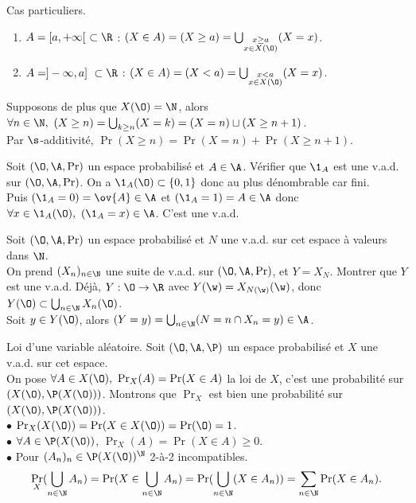 \documentclass[11pt]{article}
\begin{document}
\begin{ex}{Cas particuliers.}{}
    \begin{enumerate}
        \item $A=[a,+\infty[~\subset\R$ : $(X\in A) = (X\geq a) = \bigcup_{\substack{x\geq a\\x\in X(\O)}}(X=x)$.
        \item $A=]-\infty,a]~\subset\R$ : $(X \in A) = (X < a) = \bigcup_{\substack{x < a \\ x \in X(\O)}}(X=x)$. 
    \end{enumerate}
    Supposons de plus que $X(\O) = \N$, alors $\forall n \in \N, ~ (X\geq n) = \bigcup_{k\geq n}(X=k)=(X=n)\sqcup(X\geq n+1)$.\\
    Par $\s$-additivité, $\Pr(X\geq n) = \Pr(X=n)+\Pr(X\geq n+1)$.
\end{ex}

\pagebreak

\begin{ex}{}{}
    Soit $(\O,\A,\Pr)$ un espace probabilisé et $A\in\A$. Vérifier que $\1_A$ est une v.a.d. sur $(\O,\A,\Pr)$.
    \tcblower
    On a $\1_A(\O)\subset\{0,1\}$ donc au plus dénombrable car fini.\\
    Puis $(\1_A = 0) = \ov{A} \in \A$ et $(\1_A = 1) = A \in \A$ donc $\forall x \in \1_A(\O), ~ (\1_A = x) \in \A$. C'est une v.a.d. 
\end{ex}

\begin{exercice}{}{}
    Soit $(\O,\A,\Pr)$ un espace probabilisé et $N$ une v.a.d. sur cet espace à valeurs dans $\N$.\\
    On prend $(X_n)_{n\in\N}$ une suite de v.a.d. sur $(\O,\A,\Pr)$, et $Y=X_N$. Montrer que $Y$ est une v.a.d.
    \tcblower
    Déjà, $Y:\O\to\R$ avec $Y(\w)=X_{N(\w)}(\w)$, donc $Y(\O)\subset\bigcup_{n\in\N}X_n(\O)$.\\
    Soit $y\in Y(\O)$, alors $(Y = y) = \bigcup_{n\in\N}(N = n \cap X_n = y)\in\A$.
\end{exercice}

\begin{defi}{Loi d'une variable aléatoire.}{}
    Soit $(\O,\A,\P)$ un espace probabilisé et $X$ une v.a.d. sur cet espace.\\
    On pose $\forall A \in X(\O), ~ \Pr_X(A)=\Pr(X\in A)$ la loi de $X$, c'est une probabilité sur $(X(\O), \P(X(\O)))$.
    \tcblower
    Montrons que $\Pr_X$ est bien une probabilité sur $(X(\O), \P(X(\O)))$.\\
    $\bullet$ $\Pr_X(X(\O))=\Pr(X\in X(\O))=\Pr(\O)=1$.\\
    $\bullet$ $\forall A \in \P(X(\O))$, $\Pr_X(A)=\Pr(X\in A)\geq 0$.\\
    $\bullet$ Pour $(A_n)_n\in\P(X(\O))^\N$ 2-à-2 incompatibles.
    \begin{equation*}
        \Pr_X(\bigcup_{n\in\N}A_n) = \Pr(X\in\bigcup_{n\in\N}A_n) = \Pr(\bigcup_{n\in\N}(X\in A_n)) = \sum_{n\in\N}\Pr(X\in A_n).
    \end{equation*}
\end{defi}
\end{document}
